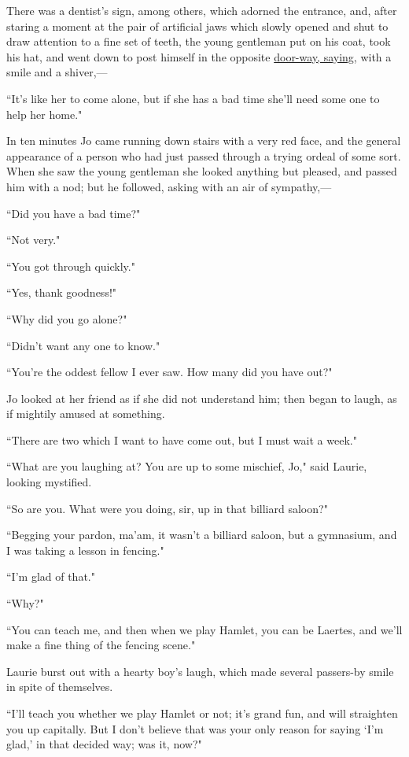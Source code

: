 There was a dentist's sign, among others, which adorned
the entrance, and, after staring a moment at the pair of artificial jaws
which slowly opened and shut to draw attention to a fine set of teeth,
the young gentleman put on his coat, took his hat, and went down to post
himself in the opposite \underline{door-way, saying,} with a smile and a
shiver,---

``It's like her to come alone, but if she has a bad time
she'll need some one to help her home."

In ten minutes Jo came running down stairs with a very red face, and the
general appearance of a person who had just passed through a trying
ordeal of some sort. When she saw the young gentleman she looked
anything but pleased, and passed him with a nod; but he followed, asking
with an air of sympathy,---

``Did you have a bad time?"

``Not very."

``You got through quickly."

``Yes, thank goodness!"

``Why did you go alone?"

``Didn't want any one to know."

``You're the oddest fellow I ever saw. How many did you
have out?"

Jo looked at her friend as if she did not understand him; then began to
laugh, as if mightily amused at something.

``There are two which I want to have come out, but I must wait a week."

``What are you laughing at? You are up to some mischief, Jo," said
Laurie, looking mystified.

``So are you. What were you doing, sir, up in that billiard saloon?"

``Begging your pardon, ma'am, it wasn't a
billiard saloon, but a gymnasium, and I was taking a lesson in fencing."

``I'm glad of that."

``Why?"

``You can teach me, and then when we play Hamlet, you can be Laertes, and
we'll make a fine thing of the fencing scene."

Laurie burst out with a hearty boy's laugh, which made
several passers-by smile in spite of themselves.

``I'll teach you whether we play Hamlet or not;
it's grand fun, and will straighten you up capitally.
But I don't believe that was your only reason for saying
`I'm glad,' in that
decided way; was it, now?"

